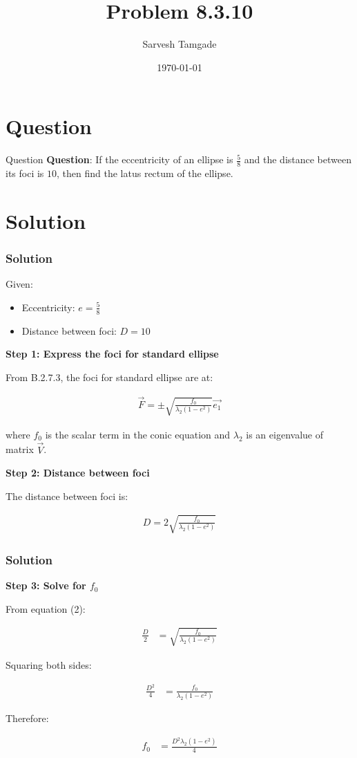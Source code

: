 \documentclass{beamer}
\title{Problem 8.3.10}
\author{Sarvesh Tamgade}
\date{\today}
\numberwithin{equation}{section}
\begin{document}
\begin{frame}
\titlepage
\end{frame}

\section{Question}
\begin{frame}{Question}
\textbf{Question}:
If the eccentricity of an ellipse is $\frac{5}{8}$ and the distance between its foci is $10$, then find the latus rectum of the ellipse.



\end{frame}

\section{Solution}
\begin{frame}[fragile]
    \frametitle{Solution}
Given:
\begin{itemize}
\item Eccentricity: $e = \frac{5}{8}$
\item Distance between foci: $D = 10$
\end{itemize}

\textbf{Step 1: Express the foci for standard ellipse}

From B.2.7.3, the foci for standard ellipse are at:

\begin{align}
\vec{F} = \pm\sqrt{\frac{f_0}{\lambda_2(1-e^2)}} \vec{e_1}
\end{align}

where $f_0$ is the scalar term in the conic equation and $\lambda_2$ is an eigenvalue of matrix $\vec{V}$.

\textbf{Step 2: Distance between foci}

The distance between foci is:

\begin{align}
D = 2\sqrt{\frac{f_0}{\lambda_2(1-e^2)}}
\end{align}


\end{frame}
\begin{frame}[fragile]
    \frametitle{Solution}
\textbf{Step 3: Solve for $f_0$}

From equation (2):

\begin{align}
\frac{D}{2} &= \sqrt{\frac{f_0}{\lambda_2(1-e^2)}}
\end{align}

Squaring both sides:

\begin{align}
\frac{D^2}{4} &= \frac{f_0}{\lambda_2(1-e^2)}
\end{align}

Therefore:

\begin{align}
f_0 &= \frac{D^2 \lambda_2(1-e^2)}{4}
\end{align}

\end{frame}
\end{document}
